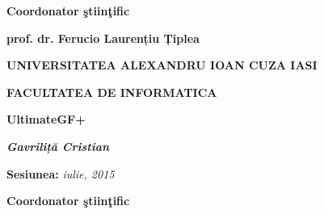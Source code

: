 \documentclass[12pt,english,hidelinks]{article}
\begin{document}
\smallskip{}


\begin{center}
\textbf{Coordonator ştiinţific}
\par\end{center}

\begin{center}
\textbf{\large{}prof. dr. Ferucio Laurențiu Țiplea}
\par\end{center}{\large \par}

\pagebreak{}

\begin{center}
\pagestyle{empty}\textbf{UNIVERSITATEA ALEXANDRU IOAN CUZA IASI}
\par\end{center}

\begin{center}
\textbf{\large{}FACULTATEA DE INFORMATICA}
\par\end{center}{\large \par}

\begin{center}
\vspace{6cm}

\par\end{center}

\begin{center}
\textbf{\LARGE{}UltimateGF+}\vspace{3cm}

\par\end{center}

\begin{center}
\textbf{\textit{\Large{}Gavriliță Cristian}}
\par\end{center}{\Large \par}

\vspace{1cm}


\begin{center}
\textbf{\Large{}Sesiunea: }\textit{\large{}iulie, 2015}
\par\end{center}{\large \par}

\vspace{2cm}


\begin{center}
\textbf{Coordonator ştiinţific}
\par\end{center}
\end{document}
